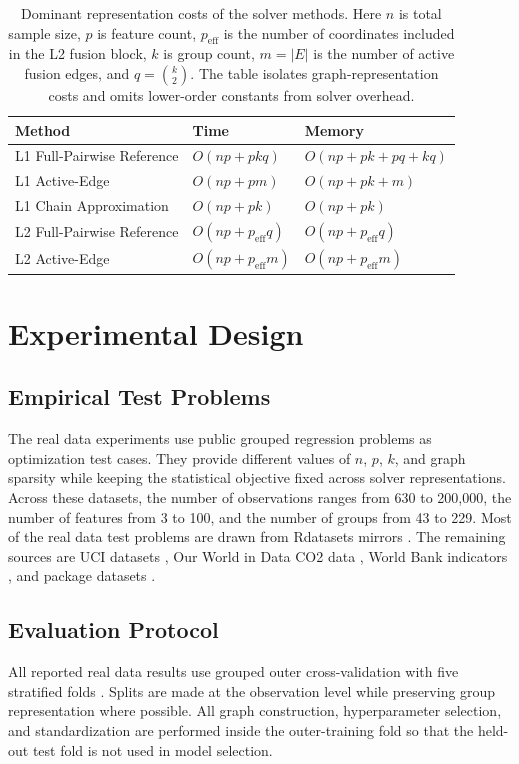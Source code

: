 \documentclass[twoside,11pt]{article}
\begin{document}
\begin{table}[t]
\centering
\caption{Dominant representation costs of the solver methods.
Here $n$ is total sample size, $p$ is feature count, $p_{\mathrm{eff}}$ is the number of coordinates included in the L2 fusion block, $k$ is group count,
$m=|E|$ is the number of active fusion edges, and $q=\binom{k}{2}$. 
The table isolates graph-representation costs and omits lower-order constants from solver overhead.}
\label{tab:complexity}
\begin{tabular}{lll}
\toprule
Method & Time & Memory \\
\midrule
L1 Full-Pairwise Reference & $O(np+pkq)$ & $O(np+pk+pq+kq)$ \\
L1 Active-Edge & $O(np+pm)$ & $O(np+pk+m)$ \\
L1 Chain Approximation & $O(np+pk)$ & $O(np+pk)$ \\
\midrule
L2 Full-Pairwise Reference & $O(np+p_{\mathrm{eff}}q)$ & $O(np+p_{\mathrm{eff}}q)$ \\
L2 Active-Edge & $O(np+p_{\mathrm{eff}}m)$ & $O(np+p_{\mathrm{eff}}m)$ \\
\bottomrule
\end{tabular}
\end{table}


\section{Experimental Design}

\subsection{Empirical Test Problems}

The real data experiments use public grouped regression problems as optimization test cases. 
They provide different values of $n$, $p$, $k$, and graph sparsity while keeping the statistical objective fixed across solver representations. 
Across these datasets, the number of observations ranges from 630 to 200,000, the number of features from 3 to 100, and the number of groups from 43 to 229. 
Most of the real data test problems are drawn from Rdatasets mirrors \citep{rdatasets}. 
The remaining sources are UCI datasets \citep{uci_communities,uci_electricity}, Our World in Data CO2 data \citep{owidco2}, World Bank indicators \citep{worldbankwdi}, and package datasets \citep{pinheiro2000mixed,raudenbush2002hlm}. 

\subsection{Evaluation Protocol}
All reported real data results use grouped outer cross-validation with five stratified folds \citep{kohavi1995cross,varma2006bias}. 
Splits are made at the observation level while preserving group representation where possible.
All graph construction, hyperparameter selection, and standardization are performed inside the outer-training fold so that the held-out test fold is not used in model selection.
\end{document}
